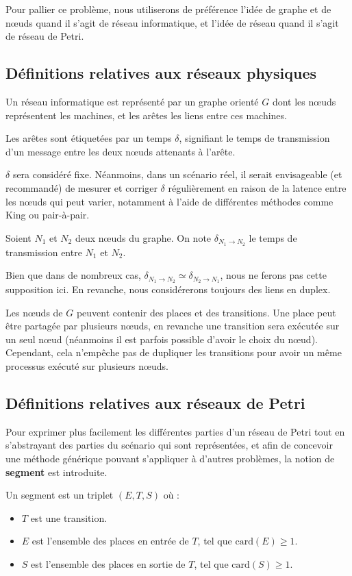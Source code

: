 Pour pallier ce problème, nous utiliserons de préférence l'idée de graphe et de nœuds quand il s'agit de réseau informatique, et l'idée de réseau quand il s'agit de réseau de Petri.

\subsection{Définitions relatives aux réseaux physiques}
\begin{mydef}
Un réseau informatique est représenté par un graphe orienté $G$ dont les nœuds représentent les machines, et les arêtes les liens entre ces machines. 

Les arêtes sont étiquetées par un temps $\delta$, signifiant le temps de transmission d'un message entre les deux nœuds attenants à l'arête.
\end{mydef}
$\delta$ sera considéré fixe. Néanmoins, dans un scénario réel, il serait envisageable (et recommandé) de mesurer et corriger $\delta$ régulièrement en raison de la latence entre les nœuds qui peut varier, notamment à l'aide de différentes méthodes comme King\cite{gummadi2002king} ou pair-à-pair\cite{im2000method}.
\\
\begin{mynot}
	Soient $N_1$ et $N_2$ deux nœuds du graphe. On note $\delta_{N_1 \rightarrow N_2}$ le temps de transmission entre $N_1$ et $N_2$.
\end{mynot} 

Bien que dans de nombreux cas, $\delta_{N_1 \rightarrow N_2} \simeq \delta_{N_2 \rightarrow N_1}$, nous ne ferons pas cette supposition ici. En revanche, nous considérerons toujours des liens en duplex.

Les nœuds de $G$ peuvent contenir des places et des transitions. Une place peut être partagée par plusieurs nœuds, en revanche une transition sera exécutée sur un seul nœud (néanmoins il est parfois possible d'avoir le choix du n\oe ud). Cependant, cela n'empêche pas de dupliquer les transitions pour avoir un même processus exécuté sur plusieurs nœuds.

\subsection{Définitions relatives aux réseaux de Petri}
Pour exprimer plus facilement les différentes parties d'un réseau de Petri tout en s'abstrayant des parties du scénario qui sont représentées, et afin de concevoir une méthode générique pouvant s'appliquer à d'autres problèmes, la notion de \textbf{segment} est introduite.
\begin{mydef}[Segment]
Un segment est un triplet $(E, T , S)$ où : 
\begin{itemize}
	\item $T$ est une transition.
	\item $E$ est l'ensemble des places en entrée de $T$, tel que $\mathrm{card}(E) \geq \num{1}$.
	\item $S$ est l'ensemble des places en sortie de $T$, tel que $\mathrm{card}(S) \geq \num{1}$.
\end{itemize} 
\end{mydef}

